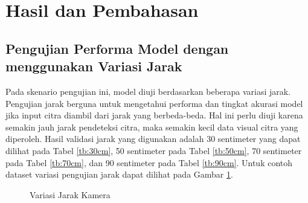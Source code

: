 \section{Hasil dan Pembahasan}
\label{sec:hasildanpembahasan}

\subsection{Pengujian Performa Model dengan menggunakan Variasi Jarak}

Pada skenario pengujian ini, model diuji berdasarkan beberapa variasi jarak. Pengujian jarak berguna untuk mengetahui performa dan tingkat akurasi model jika input citra diambil dari jarak yang berbeda-beda. Hal ini perlu diuji karena semakin jauh jarak pendeteksi citra, maka semakin kecil data visual citra yang diperoleh. Hasil validasi jarak yang digunakan adalah 30 sentimeter yang dapat dilihat pada Tabel \ref{tb:30cm}, 50 sentimeter pada Tabel \ref{tb:50cm}, 70 sentimeter pada Tabel \ref{tb:70cm}, dan 90 sentimeter pada Tabel \ref{tb:90cm}. Untuk contoh dataset variasi pengujian jarak dapat dilihat pada Gambar \ref{fig:Variasi Jarak Kamera}.

\begin{figure}[H]
  \centering
    \hfil 

    \hfil

  \caption{Variasi Jarak Kamera}
  \label{fig:Variasi Jarak Kamera}
\end{figure}

